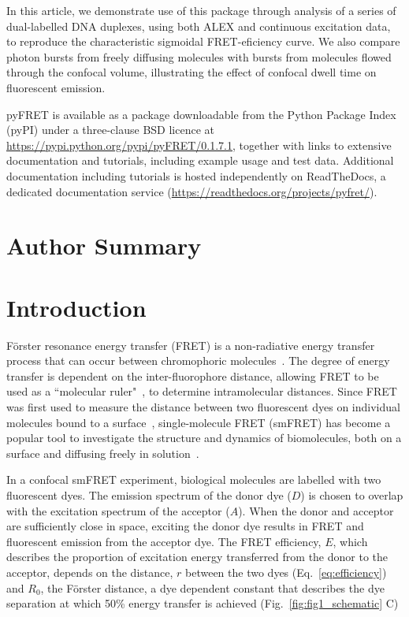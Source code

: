 \documentclass[10pt]{article}
\begin{document}
In this article, we demonstrate use of this package through analysis of a series of dual-labelled DNA duplexes, using both ALEX and continuous excitation data, to reproduce the characteristic sigmoidal FRET-eficiency curve. We also compare photon bursts from freely diffusing molecules with bursts from molecules flowed through the confocal volume, illustrating the effect of confocal dwell time on fluorescent emission.  

pyFRET is available as a package downloadable from the Python Package Index (pyPI) under a three-clause BSD licence at \url{https://pypi.python.org/pypi/pyFRET/0.1.7.1}, together with links to extensive documentation and tutorials, including example usage and test data. Additional documentation including tutorials is hosted independently on ReadTheDocs, a dedicated documentation service (\url{https://readthedocs.org/projects/pyfret/}).

\section*{Author Summary}

\section*{Introduction}
F\"{o}rster resonance energy transfer (FRET) is a non-radiative energy transfer process that can occur between chromophoric molecules~\cite{forster48}. The degree of energy transfer is dependent on the inter-fluorophore distance, allowing FRET to be used as a ``molecular ruler"~\cite{stryer67}, to determine intramolecular distances. Since FRET was first used to measure the distance between two fluorescent dyes on individual molecules bound to a surface~\cite{ha96}, single-molecule FRET (smFRET) has become a popular tool to investigate the structure and dynamics of biomolecules, both on a surface and diffusing freely in solution~\cite{haran03, schuler02, weiss00}.

In a confocal smFRET experiment, biological molecules are labelled with two fluorescent dyes. The emission spectrum of the donor dye ($D$) is chosen to overlap with the excitation spectrum of the acceptor ($A$). When the donor and acceptor are sufficiently close in space, exciting the donor dye results in FRET and fluorescent emission from the acceptor dye. The FRET efficiency, $E$, which describes the proportion of excitation energy transferred from the donor to the acceptor, depends on the distance, $r$ between the two dyes (Eq.~\ref{eq:efficiency}) and $R_0$, the F\"{o}rster distance, a dye dependent constant that describes the dye separation at which 50\% energy transfer is achieved (Fig.~\ref{fig:fig1_schematic} C)
\end{document}
